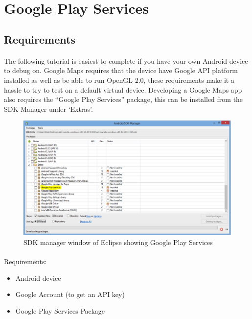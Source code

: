 \section{Google Play Services}
\subsection{Requirements}
\paragraph{} The following tutorial is easiest to complete if you have your own Android device to debug on.  Google Maps requires that the device have Google API platform installed as well as be able to run OpenGL 2.0, these requirements make it a hassle to try to test on a default virtual device.  Developing a Google Maps app also requires the “Google Play Services” package, this can be installed from the SDK Manager under ‘Extras’.

\begin{figure}[H]%
\centering
\includegraphics[width=\textwidth]{images/eclipse_sdk-manager}
\caption{SDK manager window of Eclipse showing Google Play Services}
\label{fig:eclipse-sdk-manager}
\end{figure}

\paragraph{} Requirements:

\begin{itemize}
\item Android device
\item Google Account (to get an API key)
\item Google Play Services Package
\end{itemize}

